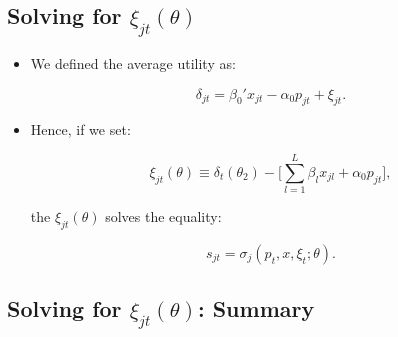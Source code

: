 \documentclass[]{book}
\providecommand{\tightlist}{%
  \setlength{\itemsep}{0pt}\setlength{\parskip}{0pt}}
\begin{document}
\subsection{\texorpdfstring{Solving for
\(\xi_{jt}(\theta)\)}{Solving for \textbackslash{}xi\_\{jt\}(\textbackslash{}theta)}}\label{solving-for-xi_jttheta}

\begin{itemize}
\tightlist
\item
  We defined the average utility as:

  \begin{equation}
  \delta_{jt} =  \beta_0' x_{jt} - \alpha_0 p_{jt} + \xi_{jt}.
  \end{equation}
\item
  Hence, if we set:

  \begin{equation}
  \xi_{jt}(\theta) \equiv \delta_t(\theta_2) - \Bigg[\sum_{l = 1}^L \beta_{l} x_{jl} + \alpha_0 p_{jt} \Bigg],
  \end{equation}

  the \(\xi_{jt}(\theta)\) solves the equality:

  \begin{equation}
  s_{jt} = \sigma_{j}(p_t, x, \xi_t; \theta).
  \end{equation}
\end{itemize}

\subsection{\texorpdfstring{Solving for \(\xi_{jt}(\theta)\):
Summary}{Solving for \textbackslash{}xi\_\{jt\}(\textbackslash{}theta): Summary}}\label{solving-for-xi_jttheta-summary}
\end{document}
